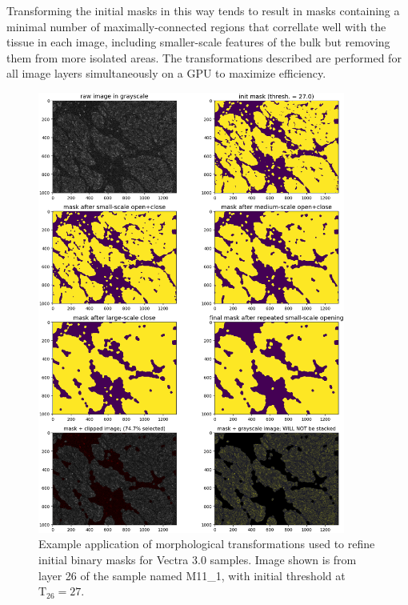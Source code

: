 \documentclass[letterpaper,11pt]{article}
\newcommand{\Tau}{\mathrm{T}}
\begin{document}
Transforming the initial masks in this way tends to result in masks containing a minimal number of maximally-connected regions that correllate well with the tissue in each image, including smaller-scale features of the bulk but removing them from more isolated areas. The transformations described are performed for all image layers simultaneously on a GPU to maximize efficiency. 

\begin{figure}[!ht]
\centering
\includegraphics[width=0.9\textwidth]{images/masking/image_218_layer_26_masks}
\caption{\footnotesize Example application of morphological transformations used to refine initial binary masks for Vectra 3.0 samples. Image shown is from layer 26 of the sample named M11\_1, with initial threshold at $\Tau_{26}=27$.}
\label{fig:mask_example_vectra_min}
\end{figure}
\end{document}
